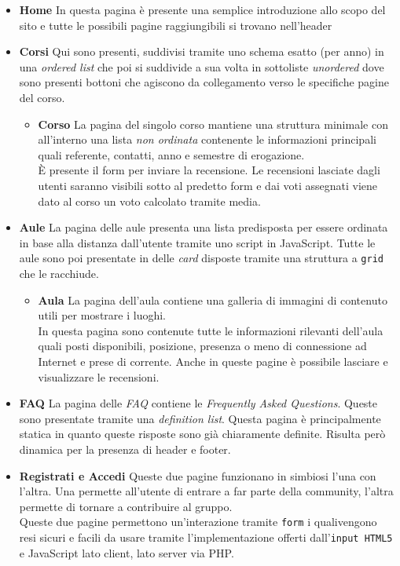 \begin{itemize}
    \item \textbf{Home} In questa pagina è presente una semplice introduzione allo scopo del sito e tutte le possibili pagine raggiungibili si trovano nell'header
    \item \textbf{Corsi} Qui sono presenti, suddivisi tramite uno schema esatto (per anno) in una \textit{ordered list} che poi si suddivide a sua volta in sottoliste \textit{unordered} dove sono presenti bottoni che agiscono da collegamento verso le specifiche pagine del corso.
    \begin{itemize}
        \item \textbf{Corso} La pagina del singolo corso mantiene una struttura minimale con all'interno una lista \textit{non ordinata} contenente le informazioni principali quali referente, contatti, anno e semestre di erogazione.\\
        È presente il form per inviare la recensione. Le recensioni lasciate dagli utenti saranno visibili sotto al predetto form e dai voti assegnati viene dato al corso un voto calcolato tramite media.
    \end{itemize}
    \item \textbf{Aule} La pagina delle aule presenta una lista predisposta per essere ordinata in base alla distanza dall'utente tramite uno script in JavaScript. Tutte le aule sono poi presentate in delle \textit{card} disposte tramite una struttura a \texttt{grid} che le racchiude.
    \begin{itemize}
        \item \textbf{Aula} La pagina dell'aula contiene una galleria di immagini di contenuto utili per mostrare i luoghi.\\
        In questa pagina sono contenute tutte le informazioni rilevanti dell'aula quali posti disponibili, posizione, presenza o meno di connessione ad Internet e prese di corrente. Anche in queste pagine è possibile lasciare e visualizzare le recensioni.
    \end{itemize}
    \item \textbf{FAQ} La pagina delle \textit{FAQ} contiene le \textit{Frequently Asked Questions}. Queste sono presentate tramite una \textit{definition list}. Questa pagina è principalmente statica in quanto queste risposte sono già chiaramente definite. Risulta però dinamica per la presenza di header e footer.
    \item \textbf{Registrati e Accedi} Queste due pagine funzionano in simbiosi l'una con l'altra. Una permette all'utente di entrare a far parte della community, l'altra permette di tornare a contribuire al gruppo.\\
    Queste due pagine permettono un'interazione tramite \texttt{form} i qualivengono resi sicuri e facili da usare tramite l'implementazione offerti dall'\texttt{input HTML5} e JavaScript lato client, lato server via PHP.
\end{itemize}

